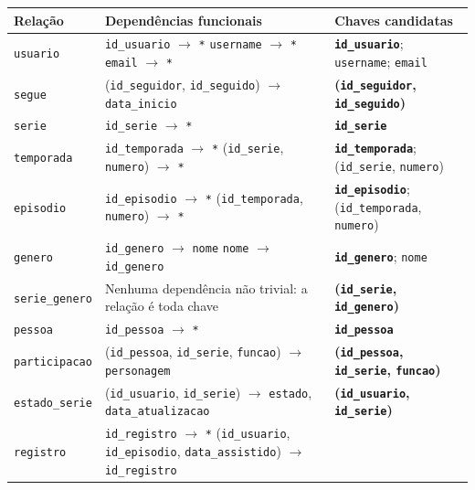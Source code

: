 \documentclass[a4paper,12pt,oneside,openany]{book}
\newcommand{\id}[1]{\texttt{#1}}
\begin{document}
\begin{longtable}{@{}p{3.6cm}p{6cm}p{6.2cm}@{}}
\toprule
\textbf{Relação} & \textbf{Dependências funcionais} & \textbf{Chaves candidatas} \\
\midrule
\endhead
\id{usuario} &
\id{id\_usuario} $\rightarrow$ \id{*}\newline
\id{username} $\rightarrow$ \id{*}\newline
\id{email} $\rightarrow$ \id{*} &
\textbf{\id{id\_usuario}}; \id{username}; \id{email} \\
\addlinespace
\id{segue} &
(\id{id\_seguidor}, \id{id\_seguido}) $\rightarrow$ \id{data\_inicio} &
\textbf{(\id{id\_seguidor}, \id{id\_seguido})} \\
\addlinespace
\id{serie} &
\id{id\_serie} $\rightarrow$ \id{*} &
\textbf{\id{id\_serie}} \\
\addlinespace
\id{temporada} &
\id{id\_temporada} $\rightarrow$ \id{*}\newline
(\id{id\_serie}, \id{numero}) $\rightarrow$ \id{*} &
\textbf{\id{id\_temporada}}; (\id{id\_serie}, \id{numero}) \\
\addlinespace
\id{episodio} &
\id{id\_episodio} $\rightarrow$ \id{*}\newline
(\id{id\_temporada}, \id{numero}) $\rightarrow$ \id{*} &
\textbf{\id{id\_episodio}}; (\id{id\_temporada}, \id{numero}) \\
\addlinespace
\id{genero} &
\id{id\_genero} $\rightarrow$ \id{nome}\newline
\id{nome} $\rightarrow$ \id{id\_genero} &
\textbf{\id{id\_genero}}; \id{nome} \\
\addlinespace
\id{serie\_genero} &
Nenhuma dependência não trivial: a relação é toda chave &
\textbf{(\id{id\_serie}, \id{id\_genero})} \\
\addlinespace
\id{pessoa} &
\id{id\_pessoa} $\rightarrow$ \id{*} &
\textbf{\id{id\_pessoa}} \\
\addlinespace
\id{participacao} &
(\id{id\_pessoa}, \id{id\_serie}, \id{funcao}) $\rightarrow$ \id{personagem} &
\textbf{(\id{id\_pessoa}, \id{id\_serie}, \id{funcao})} \\
\addlinespace
\id{estado\_serie} &
(\id{id\_usuario}, \id{id\_serie}) $\rightarrow$ \id{estado},
\id{data\_atualizacao} &
\textbf{(\id{id\_usuario}, \id{id\_serie})} \\
\addlinespace
\id{registro} &
\id{id\_registro} $\rightarrow$ \id{*}\newline
(\id{id\_usuario}, \id{id\_episodio}, \id{data\_assistido}) $\rightarrow$
\id{id\_registro} &

\end{longtable}
\end{document}
